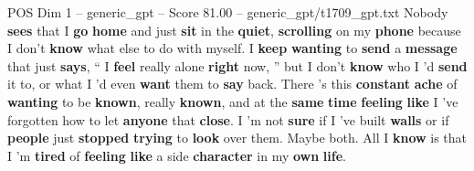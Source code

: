 \begin{textsample}{POS Dim 1 – generic\_gpt – Score 81.00 – generic\_gpt/t1709\_gpt.txt}
Nobody \textbf{sees} that I \textbf{go} \textbf{home} and just \textbf{sit} in the \textbf{quiet}, \textbf{scrolling} on my \textbf{phone} because I don't \textbf{know} what else to do with myself.
I \textbf{keep} \textbf{wanting} to \textbf{send} a \textbf{message} that just \textbf{says}, “ I \textbf{feel} really alone \textbf{right} now, ” but I don't \textbf{know} who I ’d \textbf{send} it to, or what I ’d even \textbf{want} them to \textbf{say} back.
There ’s this \textbf{constant} \textbf{ache} of \textbf{wanting} to be \textbf{known}, really \textbf{known}, and at the \textbf{same} \textbf{time} \textbf{feeling} \textbf{like} I ’ve forgotten how to let \textbf{anyone} that \textbf{close}.
I ’m not \textbf{sure} if I ’ve built \textbf{walls} or if \textbf{people} just \textbf{stopped} \textbf{trying} to \textbf{look} over them.
Maybe both.
All I \textbf{know} is that I ’m \textbf{tired} of \textbf{feeling} \textbf{like} a side \textbf{character} in my \textbf{own} \textbf{life}.

\end{textsample}
